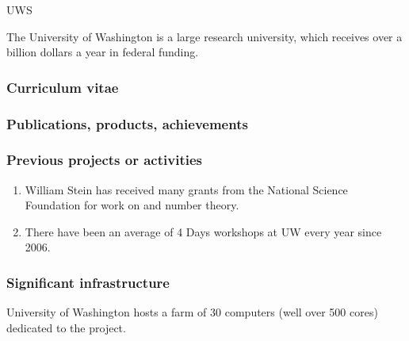 \begin{sitedescription}{UWS}


%

The University of Washington is a large research university,
which receives over a billion dollars a year in federal funding.

\subsubsection*{Curriculum vitae}



%
%

\subsubsection*{Publications, products, achievements}

\subsubsection*{Previous projects or activities}

\begin{enumerate}
\item William Stein has received many grants from the
National Science Foundation for work on \Sage and number theory.
\item  There have been an average of 4 \Sage Days workshops at UW
every year since 2006.
\end{enumerate}

\subsubsection*{Significant infrastructure}

University of Washington hosts a farm of 30 computers (well over 500
cores) dedicated to the \Sage project.

\end{sitedescription}



